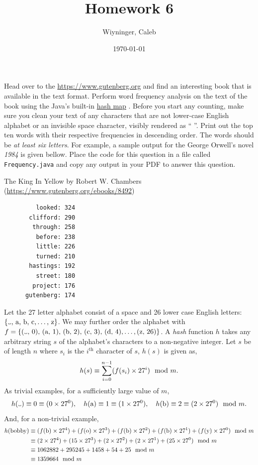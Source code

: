 \documentclass{homework}
\author{Wiyninger, Caleb}
\date{\today}
\title{Homework 6}
\newcommand\hashmap{%
  \href{%
    https://docs.oracle.com/javase/8/docs/api/java/util/HashMap.html%
  }{hash map}%
}
\renewcommand\textvisiblespace[1][.5em]{%
  \makebox[#1]{%
    \kern.07em
    \vrule height.3ex
    \hrulefill
    \vrule height.3ex
    \kern.07em
  }%
}
\begin{document}
 \maketitle

\question Head over to the \url{https://www.gutenberg.org} and find an
interesting book that is available in the text format. Perform word
frequency analysis on the text of the book using the Java's built-in
\hashmap. Before you start any counting, make sure you clean your text
of any characters that are not lower-case English alphabet or an
invisible space character, visibly rendered as
``\textvisiblespace''. Print out the top ten words with their
respective frequencies in descending order. The words should be
\textit{at least six letters}. For example, a sample output for the
George Orwell's novel \textit{1984} is given bellow. Place the code
for this question in a file called \texttt{Frequency.java} and copy
any output in your PDF to answer this question.

\begin{sol}
  The King In Yellow by Robert W. Chambers
  (\url{https://www.gutenberg.org/ebooks/8492})
\begin{verbatim}
         looked: 324
       clifford: 290
        through: 258
         before: 238
         little: 226
         turned: 210
       hastings: 192
         street: 180
        project: 176
      gutenberg: 174
\end{verbatim}
\end{sol}

\question Let the 27 letter alphabet consist of a space and 26 lower case
English letters: $\{\text{\textvisiblespace, a, b, c,} \hdots
  \text{, z}\}$. We may further order the alphabet with $f =
  \{\text{(\textvisiblespace, 0), (a, 1), (b, 2), (c, 3), (d,
    4),}\hdots, \text{(z, 26)}\}$. A \emph{hash} function $h$ takes
any arbitrary string $s$ of the alphabet's characters to a
non-negative integer. Let $s$ be of length $n$ where $s_i$ is the
$i^\text{th}$ character of $s$, $h(s)$ is given as,
\[
  h(s) \equiv \sum_{i=0}^{n-1}(f(s_{i})\times 27^i) \mod m.
\]
As trivial examples, for a sufficiently large value of $m$,
\[
  h(\text{\textvisiblespace})  \is 0 \is (0 \times 27^0), \quad
  h(\text{a})                  \is 1 \is (1 \times 27^0), \quad
  h(\text{b})                  \is 2 \is (2 \times 27^0) \mod m.
\]
And, for a non-trivial example,
\begin{align*}
  h(\text{bobby})
   & \equiv (f(\text{b}) \times 27^4)+(f(\text{o}) \times 27^3)+(f(\text{b}) \times 27^2)+(f(\text{b}) \times 27^1)+(f(\text{y}) \times 27^0) \mod m \\
   & \equiv (2 \times 27^4)+(15 \times 27^3)+(2 \times 27^2)+(2 \times 27^1)+(25 \times 27^0) \mod m                                                 \\
   & \equiv 1062882 + 295245 + 1458 + 54 + 25 \mod m                                                                                                 \\
   & \equiv 1359664 \mod m
\end{align*}
\end{document}

